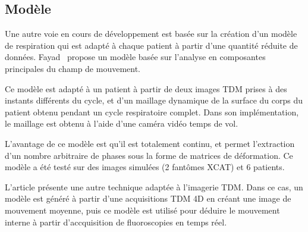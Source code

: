 \subsection{Modèle}

Une autre voie en cours de développement est basée sur la création d'un modèle de respiration qui est adapté à chaque patient à partir d'une quantité réduite de données. Fayad~\cite{fayad2010application} propose un modèle basée sur l'analyse en composantes principales du champ de mouvement. 

Ce modèle est adapté à un patient à partir de deux images TDM prises à des instants différents du cycle, et d'un maillage dynamique de la surface du corps du patient obtenu pendant un cycle respiratoire complet. Dans son implémentation, le maillage est obtenu à l'aide d'une caméra vidéo temps de vol.

L'avantage de ce modèle est qu'il est totalement continu, et permet l'extraction d'un nombre arbitraire de phases sous la forme de matrices de déformation. Ce modèle a été testé sur des images simulées (2 fantômes XCAT) et 6 patients.

L'article \cite{vandemeulebroucke2009respiratory} présente une autre technique adaptée à l'imagerie TDM. Dans ce cas, un modèle est généré à partir d'une acquisitions TDM 4D en créant une image de mouvement moyenne, puis ce modèle est utilisé pour déduire le mouvement interne à partir d'accquisition de fluoroscopies en temps réel.